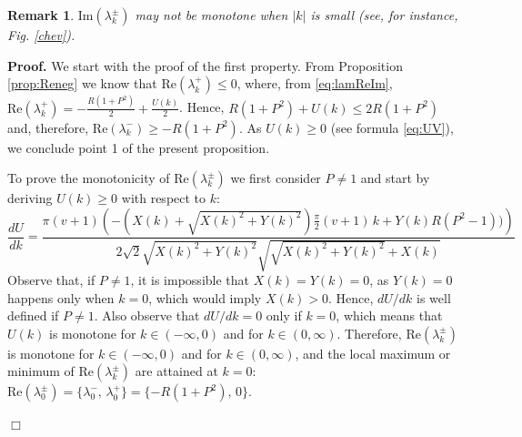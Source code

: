 \documentclass[a4paper]{article}
\newtheorem{rem}[thm]{Remark}
\def\Re{{\textrm{Re}}}
\def\Im{{\textrm{Im}}}
\numberwithin{equation}{section}
\newenvironment{pf}{\vspace{0.5em}\noindent\textbf{Proof.} }{\quad \hfill $\Box$ \\ \vspace{0.2em}\\}
\begin{document}
\begin{rem}
$\Im(\lambda_k^{\pm})$ may not be monotone when $|k|$ is small (see, for instance, Fig. \ref{chev}).
\end{rem}
\begin{pf}
We start with the proof of the first property. From Proposition \ref{prop:Reneg} we know that $\Re(\lambda_k^{+})\leq 0$, where, from \eqref{eq:lamReIm}, $\Re(\lambda_k^{+}) = -\frac{R(1+P^2)}{2}+\frac{U(k)}{2}$. Hence, $R(1+P^2)+U(k)\leq 2R(1+P^2)$ and, therefore, $\Re(\lambda_k^{-})\geq -R(1+P^2)$. As $U(k)\geq 0$ (see formula \eqref{eq:UV}), we conclude point 1 of the present proposition.

To prove the monotonicity of $\Re(\lambda_k^{\pm})$ we first consider $P\neq 1$ and start by deriving $U(k)\geq 0$ with respect to $k$:
$$\dfrac{dU}{dk} = \dfrac{\pi (v+1) \left( -(X(k)+\sqrt{X(k)^2+Y(k)^2})\frac{\pi}{2}  (v+1) \, k+Y(k) R (P^2-1))\right)}{2\sqrt{2} \sqrt{X(k)^2+Y(k)^2} \sqrt{\sqrt{X(k)^2+Y(k)^2}+X(k)}} $$
Observe that, if $P\neq 1$, it is impossible that $X(k)=Y(k)=0$, as $Y(k)=0$ happens only when $k=0$, which would imply $X(k)>0$. Hence, $dU/dk$ is well defined if $P\neq 1$. Also observe that $dU/dk = 0$ only if $k=0$, which means that $U(k)$ is monotone for $k\in (-\infty,0)$ and for $k\in (0,\infty)$. Therefore, $\Re(\lambda_k^{\pm})$ is monotone for $k\in (-\infty,0)$ and for $k\in (0,\infty)$, and the local maximum or minimum of $\Re(\lambda_k^{\pm})$ are attained at $k=0$: $\Re(\lambda_0^{\pm})=\{ \lambda_0^-,\,\lambda_0^+\} =\{ -R(1+P^2),\, 0 \}$.


\end{pf}
\end{document}
